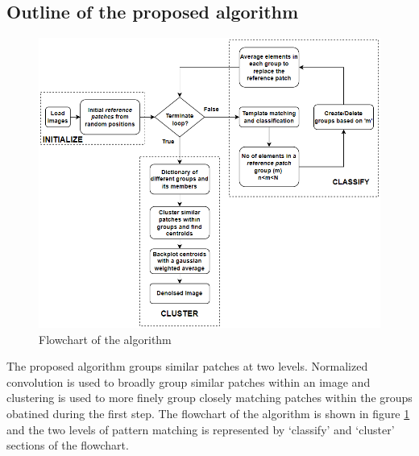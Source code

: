 \documentclass[fleqn,10pt]{wlscirep}
\begin{document}
	\subsection*{Outline of the proposed algorithm}
	
	\begin{figure}
		\centering
		\includegraphics[scale=0.7]{./imgs/flowchart.png}
		\caption{Flowchart of the algorithm}
		\label{fig:flowchart}
	\end{figure} 
	
	The proposed algorithm groups similar patches at two levels. Normalized convolution is used to broadly group similar patches within an image and clustering is used to more finely group closely matching patches within the groups obatined during the first step. The flowchart of the algorithm is shown in figure \ref{fig:flowchart} and the two levels of pattern matching is represented by `classify' and `cluster' sections of the flowchart.
	
\end{document}
